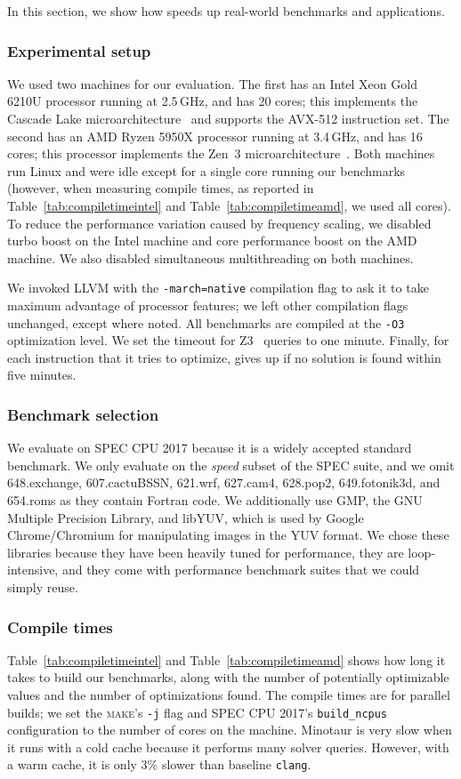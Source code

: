 In this section, we show how \minotaur{} speeds up real-world benchmarks
and applications.

\subsubsection{Experimental setup}
%
We used two machines for our evaluation.
%
The first has an Intel Xeon Gold 6210U processor running at 2.5\,GHz,
and has 20 cores; this implements the Cascade Lake
microarchitecture~\cite{cascadelake} and supports the AVX-512
instruction set.
%
The second has an AMD Ryzen 5950X processor running at 3.4\,GHz, and
has 16 cores; this processor implements the Zen~3
microarchitecture~\cite{zen3}.
%
Both machines run Linux and were idle except for a single core running
our benchmarks (however, when measuring compile times, as reported in
Table~\ref{tab:compiletimeintel} and Table~\ref{tab:compiletimeamd}, we used all cores).
%
To reduce the performance variation caused by frequency scaling, we
disabled turbo boost on the Intel machine and core performance
boost on the AMD machine.
%
We also disabled simultaneous multithreading on both machines.


We invoked LLVM with the \texttt{-march=native} compilation flag to
ask it to take maximum advantage of processor features; we left other
compilation flags unchanged, except where noted.
%
All benchmarks are compiled at the \texttt{-O3} optimization level.
%
We set the timeout for Z3~\cite{z3} queries to one minute.
%
Finally, for each instruction that it tries to optimize, \minotaur{} gives
up if no solution is found within five minutes.


\subsubsection{Benchmark selection}
%
We evaluate on SPEC CPU 2017 because it is a widely accepted standard
benchmark.
%
We only evaluate on the \emph{speed} subset of the SPEC suite, and we
omit 648.exchange, 607.cactuBSSN, 621.wrf, 627.cam4, 628.pop2,
649.fotonik3d, and 654.roms as they contain Fortran code.
%
We additionally use GMP, the GNU Multiple Precision Library, and
libYUV, which is used by Google Chrome/Chromium for manipulating
images in the YUV format.
%
We chose these libraries because they have been heavily tuned for
performance, they are loop-intensive, and they come with performance
benchmark suites that we could simply reuse.


\subsubsection{Compile times}
%
Table~\ref{tab:compiletimeintel} and Table~\ref{tab:compiletimeamd}
shows how long it takes \minotaur{} to build our benchmarks, along
with the number of potentially optimizable values and the number of
optimizations found.
%
The compile times are for parallel builds; we set the \textsc{make}'s
\texttt{-j} flag and SPEC CPU 2017's \texttt{build\_ncpus}
configuration to the number of cores on the machine.
%
Minotaur is very slow when it runs with a cold cache because it
performs many solver queries.
%
However, with a warm cache, it is only 3\% slower than baseline \texttt{clang}.



